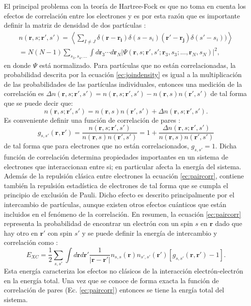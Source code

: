   \par El principal problema con la teor\'ia de Hartree-Fock es que no toma en cuenta los efectos de correlaci\'on entre los electrones y es por esta raz\'on que es importante definir la matriz de densidad   de dos part\'iculas \cite{MB-2015}:
  \begin{multline}
  n(\pmb{r},s; \pmb{r'},s' )= \left\langle \sum_{I \not= J} \delta (\pmb{r}- \pmb{r_i}) \delta (s-s_i) (\pmb{r'}- \pmb{r_j}) \delta (s'-s_i) )  \right\rangle \\
  = N(N-1) \sum_{s_3,s_4,...} \int d \pmb{r}_3 \cdots d \pmb{r}_N |\Psi (\pmb{r},s; \pmb{r'},s'; \pmb{r}_3,s_3; ..., \pmb{r}_N,s_N)|^2   \label{ec:joindensity},
  \end{multline}
  en donde $\Psi$ est\'a normalizado. Para part\'iculas que no est\'an correlacionadas, la probabilidad descrita por la ecuaci\'on \ref{ec:joindensity} es igual a la multiplicaci\'on de las probabilidades de las part\'iculas individuales, entonces una medici\'on de la correlaci\'on es $\Delta n(\pmb{r},s; \pmb{r'},s' )= n(\pmb{r},s; \pmb{r'},s' ) -n(\pmb{r},s) n( \pmb{r'},s' )$ de tal forma que se puede decir que:
  \begin{equation}
  n(\pmb{r},s; \pmb{r'},s' )= n(\pmb{r},s) n( \pmb{r'},s' ) + \Delta n(\pmb{r},s; \pmb{r'},s' ). \label{ec:def2joinprob} 
  \end{equation}
  Es conveniente definir una funci\'on de correlaci\'on de pares \cite{MB-2015}:
  \begin{equation}
  g_{s,s'} (\pmb{r},\pmb{r'})= \frac{n(\pmb{r},s; \pmb{r'},s' )}{n(\pmb{r},s) n( \pmb{r'},s' )} = 1+ \frac{\Delta n(\pmb{r},s; \pmb{r'},s' )}{n(\pmb{r},s) n( \pmb{r'},s' )} \label{ec:paircorr}
  \end{equation} 
  de tal forma que para electrones que no est\'an correlacionados, $g_{s,s'}=1$. Dicha funci\'on de correlaci\'on determina propiedades importantes en un sistema de electrones que interaccionan entre si; en particular afecta la energ\'ia del sistema. Adem\'as de la repulsi\'on cl\'asica entre electrones la ecuaci\'on \ref{ec:paircorr}, contiene tambi\'en la repulsi\'on estad\'istica de electrones de tal forma que se cumpla  el principio de exclusi\'on de Pauli. Dicho efecto es descrito principalmente por el intercambio de part\'iculas, aunque existen otros efectos cu\'anticos que est\'an incluidos en el fen\'omeno de la correlaci\'on. En resumen, la ecuaci\'on \ref{ec:paircorr} representa la probabilidad de encontrar un electr\'on con un spin $s$ en $\pmb{r}$ dado que hay otro en  $\pmb{r'}$ con spin $s'$ y se puede definir la energ\'ia de intercambio y correlaci\'on como \cite{MB-2015}:
  \begin{equation}
  E_{XC} = \frac{1}{2} \sum_{s,s '} \int d \pmb{r} d \pmb{r'} \frac{1}{|\pmb{r}- \pmb{r'}|} n_{s,s} (\pmb{r}) n_{s',s'} (\pmb{r'}) [g_{s,s'} (\pmb{r}, \pmb{r'})-1]. \label{ec:energiaXC}
  \end{equation} 
  Esta energ\'ia caracteriza los efectos no cl\'asicos de la interacci\'on  electr\'on-electr\'on en la energ\'ia total. Una vez que se conoce de forma exacta  la funci\'on de correlaci\'on de pares (Ec. \ref{ec:paircorr}) entonces se tiene la enrg\'ia total del sistema.
